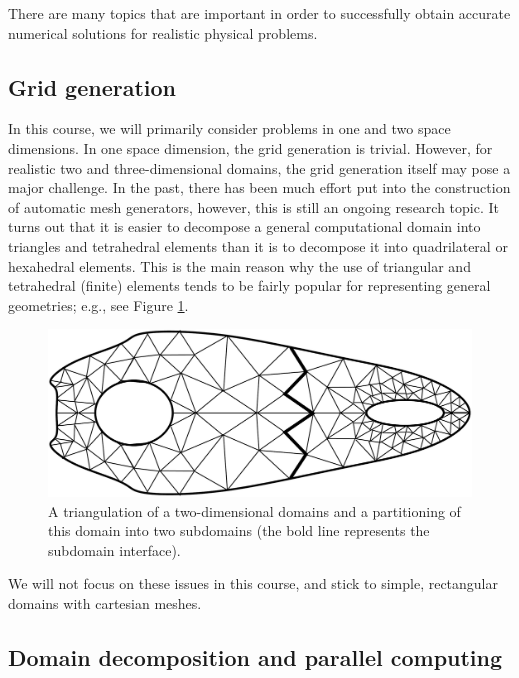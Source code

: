 \documentclass[11pt]{article}
\begin{document}
There are many topics that are important in order to 
successfully obtain accurate numerical solutions for 
realistic physical problems. 

\subsection{Grid generation}

In this course, we will primarily consider problems 
in one and two space dimensions. In one space dimension, 
the grid generation is trivial.
However, for realistic two and three-dimensional domains, 
the grid generation itself may pose a major challenge. 
In the past, there has been much effort put into the construction 
of automatic mesh generators, however, this is still an ongoing
research topic. It turns out that it is easier to 
decompose a general computational domain into triangles and 
tetrahedral elements than it is to decompose it into quadrilateral or 
hexahedral elements. This is the main reason why the use of
triangular and tetrahedral (finite) elements tends to be fairly popular
for representing general geometries; e.g., see Figure \ref{fig:dd_grid}.

\begin{figure}[htbp]
  \begin{center}
    \includegraphics[scale=0.25]{dd_grid}
  \end{center}
\caption{A triangulation of a two-dimensional domains 
and a partitioning of this domain into two subdomains
(the bold line represents the subdomain interface). 
}
\label{fig:dd_grid}
\end{figure}
\vspace{.1in}

We will not focus on these issues in this course, and stick to simple,
rectangular domains with cartesian meshes.

\subsection{Domain decomposition and parallel computing}
\end{document}
